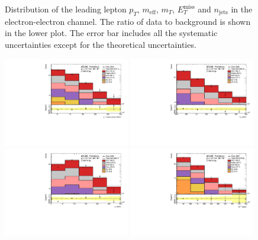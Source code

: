 \begin{figure}[htbp]
\begin{center}
\end{center}
\caption{Distribution of the  leading lepton $p_T$, $m_{\text{eff}}$, $m_T$, $E_{T}^{\text{miss}}$ and $n_{\text{jets}}$ in the electron-electron channel. The ratio of data to background is shown in the lower plot. The error bar includes all the systematic uncertainties except for the theoretical uncertainties.}
\label{fig:VRSS_fake_ee}
\end{figure}

\begin{figure}[htbp]
\includegraphics[width=0.49\textwidth]{data/plot/DataFakes/FakeEff/IntNote_pTlead_mumu.pdf}
\includegraphics[width=0.49\textwidth]{data/plot/DataFakes/FakeEff/IntNote_meff_mumu.pdf}\\
\includegraphics[width=0.49\textwidth]{data/plot/DataFakes/FakeEff/IntNote_mT_mumu.pdf}
\includegraphics[width=0.49\textwidth]{data/plot/DataFakes/FakeEff/IntNote_met_mumu.pdf}\\

\end{figure}
